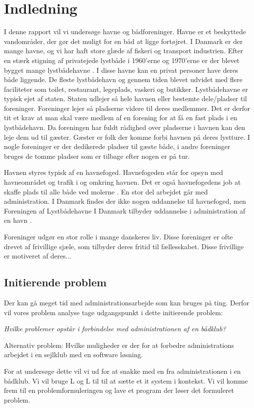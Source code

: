 \chapter{Indledning}
I denne rapport vil vi undersøge havne og bådforeninger. Havne er et beskyttede vandområder, der gør det muligt for en båd at ligge fortøjret. I Danmark er der mange havne, og vi har haft store glæde af fiskeri og transport industrien. Efter en stærk stigning af privatejede lystbåde i 1960'erne og 1970'erne er der blevet bygget mange lystbådehavne \cite{gyldendal_redaktionen_havn_2013}. I disse havne kan en privat personer have deres både liggende. De fleste lystbådehavn og gennem tiden blevet udvidet med flere faciliteter som toilet, restaurant, legeplads, vaskeri og butikker. Lystbådehavne er   typisk ejet af staten. Staten udlejer så hele havnen eller bestemte dele/pladser til foreninger. Foreninger lejer så pladserne videre til deres medlemmer. Det er derfor tit et krav at man skal være medlem af en forening for at få en fast plads i en lystbådehavn. Da foreningen har fuldt rådighed over pladserne i havnen kan den leje dem ud til gæster. Gæster er folk der komme forbi havnen på deres lystture. I nogle foreninger er der dedikerede pladser til gæste både, i andre foreninger bruges de tomme pladser som er tilbage efter nogen er på tur.  

Havnen styres typisk af en havnefoged. Havnefogeden står for opsyn med havneområdet og trafik i og omkring havnen. Det er også havnefogedens job at skaffe plads til alle både ved molerne \cite{undervisningsministeriet_havnefoged_2014}. En stor del arbejdet går med administration. I Danmark findes der ikke nogen uddannelse til havnefoged, men Foreningen af Lystbådehavne I Danmark tilbyder uddannelse i administration af en havn \cite{lystbadehavne_i_danmark}.

Foreninger udgør en stor rolle i mange danskeres liv. Disse foreninger er ofte drevet af frivillige sjæle, som tilbyder deres fritid til fællesskabet. Disse frivillige er motiveret af deres...

\section{Initierende problem}

Der kan gå meget tid med administrationsarbejde som kan bruges på ting. Derfor vil vores problem analyse tage udgangspunkt i dette initierende problem:

\textit{Hvilke problemer opstår i forbindelse med administrationen af en bådklub?}

Alternativ problem:
Hvilke muligheder er der for at forbedre administrations arbejdet i en sejlklub med en software løsning.

For at undersøge dette vil vi ud for at snakke med en fra administrationen i en bådklub. Vi vil bruge L og L til til at sætte et it system i kontekst. Vi vil komme frem til en problemformuleringen og lave et program der løser det formuleret problem.
